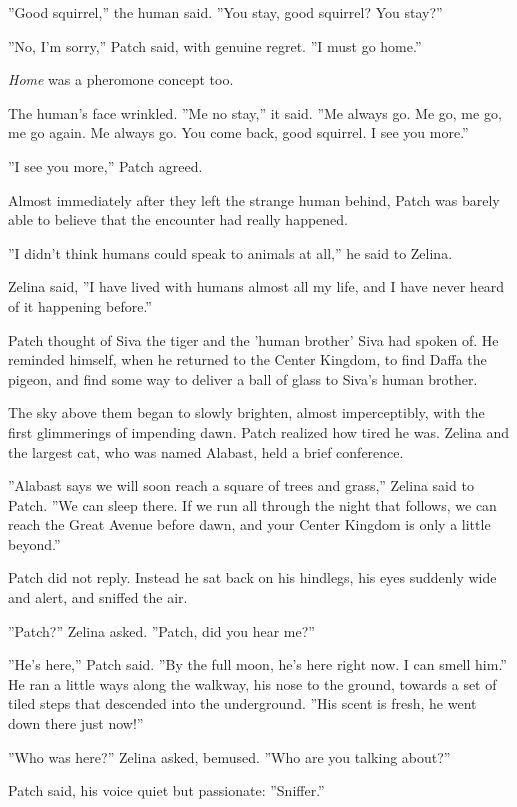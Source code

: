 \documentclass[12pt]{book}
\begin{document}
''Good squirrel,'' the human said. ''You stay, good squirrel? You
stay?''

''No, I'm sorry,'' Patch said, with genuine regret. ''I must go
home.''

\textit{Home} was a pheromone concept too.

The human's face wrinkled. ''Me no stay,'' it said. ''Me always go. Me
go, me go, me go again. Me always go. You come back, good squirrel. I
see you more.''

''I see you more,'' Patch agreed.

Almost immediately after they left the strange human behind, Patch was
barely able to believe that the encounter had really happened.

''I didn't think humans could speak to animals at all,'' he said to
Zelina.

Zelina said, ''I have lived with humans almost all my life, and I have
never heard of it happening before.''

Patch thought of Siva the tiger and the 'human brother' Siva had
spoken of. He reminded himself, when he returned to the Center
Kingdom, to find Daffa the pigeon, and find some way to deliver a ball
of glass to Siva's human brother.

The sky above them began to slowly brighten, almost imperceptibly,
with the first glimmerings of impending dawn. Patch realized how tired
he was. Zelina and the largest cat, who was named Alabast, held a
brief conference.

''Alabast says we will soon reach a square of trees and grass,''
Zelina said to Patch. ''We can sleep there. If we run all through the
night that follows, we can reach the Great Avenue before dawn, and
your Center Kingdom is only a little beyond.''

Patch did not reply. Instead he sat back on his hindlegs, his eyes
suddenly wide and alert, and sniffed the air.

''Patch?'' Zelina asked. ''Patch, did you hear me?''

''He's here,'' Patch said. ''By the full moon, he's here right now. I
can smell him.'' He ran a little ways along the walkway, his nose to
the ground, towards a set of tiled steps that descended into the
underground. ''His scent is fresh, he went down there just now!''

''Who was here?'' Zelina asked, bemused. ''Who are you talking
about?''

Patch said, his voice quiet but passionate: ''Sniffer.''
\end{document}
